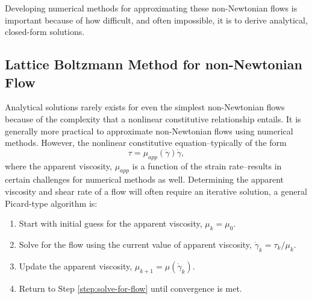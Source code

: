 \documentclass{article}
\begin{document}
Developing numerical methods for approximating these non-Newtonian flows is important because of how difficult, and often impossible, it is to derive analytical, closed-form solutions.

\subsection{Lattice Boltzmann Method for non-Newtonian Flow} \label{sec:lbm-for-nnf} %

Analytical solutions rarely exists for even the simplest non-Newtonian flows because of the complexity that a nonlinear constitutive relationship entails.
It is generally more practical to approximate non-Newtonian flows using numerical methods.
However, the nonlinear constitutive equation--typically of the form \begin{equation} \label{eq:non-newtonian}
\tau = \mu_{app}(\dot{\gamma}) \dot{\gamma},
\end{equation}\noindent where the apparent viscosity, $\mu_{app}$ is a function of the strain rate--results in certain challenges for numerical methods as well.
Determining the apparent viscosity and shear rate of a flow will often require an iterative solution, a general Picard-type algorithm is:

\begin{enumerate}
	\item Start with initial guess for the apparent viscosity, $\mu_k = \mu_0$.
	\item \label{step:solve-for-flow} Solve for the flow using the current value of apparent viscosity, $\dot{\gamma}_k = \tau_k / \mu_k$.
	\item Update the apparent viscosity, $\mu_{k+1} = \mu(\dot{\gamma}_k)$.
	\item Return to Step \ref{step:solve-for-flow} until convergence is met.
\end{enumerate}
\end{document}

